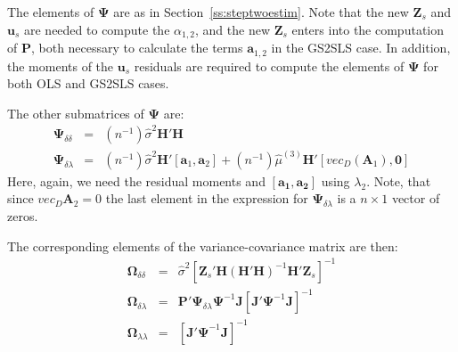 \documentclass{article}
\begin{document}
The elements of $\mathbf{\Psi}$ are as in Section~\ref{ss:steptwoestim}. Note that the
new $\mathbf{Z}_s$ and $\mathbf{u}_s$ are needed to compute the $\alpha_{1,2}$, and
the new $\mathbf{Z}_s$ enters into the computation of $\mathbf{P}$, both necessary
to calculate the terms $\mathbf{a}_{1, 2}$  in the GS2SLS case. In addition, the moments
of the $\mathbf{u}_s$ residuals are required to compute the elements of $\mathbf{\Psi}$ for
both OLS and GS2SLS cases.

The other submatrices of $\mathbf{\Psi}$ are:
\begin{eqnarray*}
\mathbf{\Psi}_{\delta \delta} &=& (n^{-1}) \hat{\sigma}^2 \mathbf{H}'\mathbf{H}\\
\mathbf{\Psi}_{\delta \lambda} &=&  (n^{-1}) \hat{\sigma}^2  \mathbf{H}'[\mathbf{a}_1, \mathbf{a}_2]
   + (n^{-1}) \hat{\mu}^{(3)} \mathbf{H}'[vec_D(\mathbf{A}_1),\mathbf{0}]
\end{eqnarray*}
Here, again, we need the residual moments and $[\mathbf{a_1, a_2}]$ using $\lambda_2$.
Note, that since $vec_D \mathbf{A}_2 = 0$ the last element in the expression
for $\mathbf{\Psi}_{\delta \lambda}$ is a $n \times 1$ vector of zeros.

The corresponding elements of the variance-covariance matrix are then:
\begin{eqnarray*}
\mathbf{\Omega}_{\delta \delta} &=& \hat{\sigma}^2 [ \mathbf{Z}_s' \mathbf{H} (\mathbf{H'H})^{-1} \mathbf{H}' \mathbf{Z}_s ]^{-1}\\
\mathbf{\Omega}_{\delta \lambda} &=& \mathbf{P}'\mathbf{\Psi}_{\delta \lambda} \mathbf{\Psi}^{-1} \mathbf{J} [ \mathbf{J}' \mathbf{\Psi}^{-1} \mathbf{J} ]^{-1}\\
\mathbf{\Omega}_{\lambda \lambda} &=& [ \mathbf{J}' \mathbf{\Psi}^{-1} \mathbf{J} ]^{-1}
\end{eqnarray*}




\end{document}

